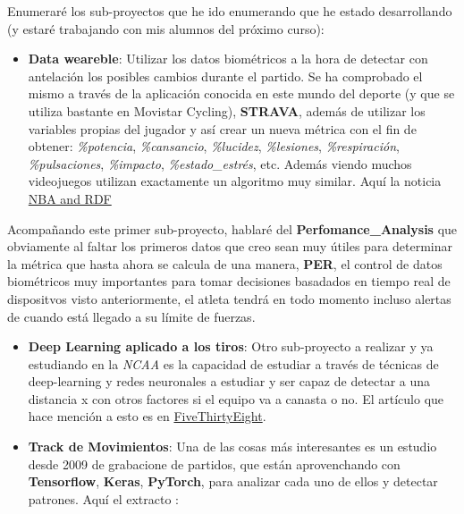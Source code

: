 \documentclass[]{article}
\providecommand{\tightlist}{%
  \setlength{\itemsep}{0pt}\setlength{\parskip}{0pt}}
\begin{document}
Enumeraré los sub-proyectos que he ido enumerando que he estado
desarrollando (y estaré trabajando con mis alumnos del próximo curso):

\begin{itemize}
\tightlist
\item
  \textbf{Data weareble}: Utilizar los datos biométricos a la hora de
  detectar con antelación los posibles cambios durante el partido. Se ha
  comprobado el mismo a través de la aplicación conocida en este mundo
  del deporte (y que se utiliza bastante en Movistar Cycling),
  \textbf{STRAVA}, además de utilizar los variables propias del jugador
  y así crear un nueva métrica con el fin de obtener: \emph{\%potencia},
  \emph{\%cansancio}, \emph{\%lucidez}, \emph{\%lesiones},
  \emph{\%respiración}, \emph{\%pulsaciones}, \emph{\%impacto},
  \emph{\%estado\_estrés}, etc. Además viendo muchos videojuegos
  utilizan exactamente un algoritmo muy similar. Aquí la noticia
  \href{https://www.zdnet.com/article/nba-analytics-and-rdf-graphs-game-data-and-metadata-evolution-and-occams-razor/}{NBA
  and RDF}
\end{itemize}

Acompañando este primer sub-proyecto, hablaré del
\textbf{Perfomance\_Analysis} que obviamente al faltar los primeros
datos que creo sean muy útiles para determinar la métrica que hasta
ahora se calcula de una manera, \textbf{PER}, el control de datos
biométricos muy importantes para tomar decisiones basadados en tiempo
real de dispositvos visto anteriormente, el atleta tendrá en todo
momento incluso alertas de cuando está llegado a su límite de fuerzas.

\begin{itemize}
\item
  \textbf{Deep Learning aplicado a los tiros}: Otro sub-proyecto a
  realizar y ya estudiando en la \emph{NCAA} es la capacidad de estudiar
  a través de técnicas de deep-learning y redes neuronales a estudiar y
  ser capaz de detectar a una distancia x con otros factores si el
  equipo va a canasta o no. El artículo que hace mención a esto es en
  \href{https://fivethirtyeight.com/features/how-mapping-shots-in-the-nba-changed-it-forever/}{FiveThirtyEight}.
\item
  \textbf{Track de Movimientos}: Una de las cosas más interesantes es un
  estudio desde 2009 de grabacione de partidos, que están aprovenchando
  con \textbf{Tensorflow}, \textbf{Keras}, \textbf{PyTorch}, para
  analizar cada uno de ellos y detectar patrones. Aquí el extracto :
\end{itemize}
\end{document}
